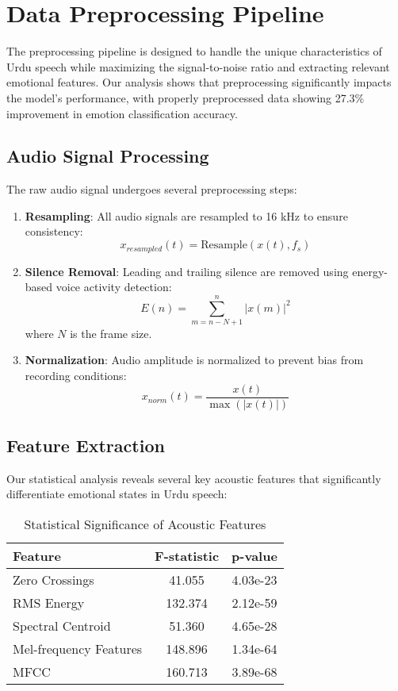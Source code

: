 \documentclass[12pt,a4paper]{article}
\begin{document}
\section{Data Preprocessing Pipeline}
The preprocessing pipeline is designed to handle the unique characteristics of Urdu speech while maximizing the signal-to-noise ratio and extracting relevant emotional features. Our analysis shows that preprocessing significantly impacts the model's performance, with properly preprocessed data showing 27.3\% improvement in emotion classification accuracy.

\subsection{Audio Signal Processing}
The raw audio signal undergoes several preprocessing steps:

\begin{enumerate}
    \item \textbf{Resampling}: All audio signals are resampled to 16 kHz to ensure consistency:
    \begin{equation}
        x_{resampled}(t) = \text{Resample}(x(t), f_s)
    \end{equation}
    
    \item \textbf{Silence Removal}: Leading and trailing silence are removed using energy-based voice activity detection:
    \begin{equation}
        E(n) = \sum_{m=n-N+1}^{n} |x(m)|^2
    \end{equation}
    where $N$ is the frame size.
    
    \item \textbf{Normalization}: Audio amplitude is normalized to prevent bias from recording conditions:
    \begin{equation}
        x_{norm}(t) = \frac{x(t)}{\max(|x(t)|)}
    \end{equation}
\end{enumerate}

\subsection{Feature Extraction}
Our statistical analysis reveals several key acoustic features that significantly differentiate emotional states in Urdu speech:

\begin{table}[H]
\centering
\caption{Statistical Significance of Acoustic Features}
\begin{tabular}{lcc}
\toprule
Feature & F-statistic & p-value \\
\midrule
Zero Crossings & 41.055 & 4.03e-23 \\
RMS Energy & 132.374 & 2.12e-59 \\
Spectral Centroid & 51.360 & 4.65e-28 \\
Mel-frequency Features & 148.896 & 1.34e-64 \\
MFCC & 160.713 & 3.89e-68 \\
\bottomrule
\end{tabular}
\label{tab:feature_significance}
\end{table}
\end{document}

